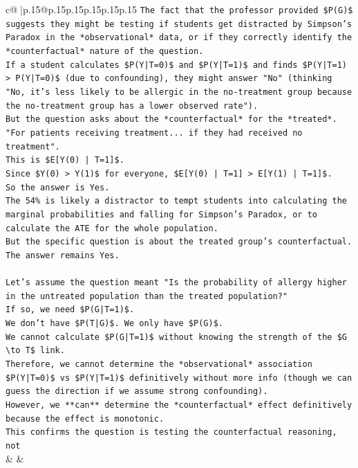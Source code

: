 \documentclass{article}
\begin{document}
{\begin{supertabular}{c@{$\;$}|p{.15\linewidth}@{}p{.15\linewidth}p{.15\linewidth}p{.15\linewidth}p{.15\linewidth}p{.15\linewidth}}
{{{\texttt{The fact that the professor provided \$P(G)\$ suggests they might be testing if students get distracted by Simpson's Paradox in the *observational* data, or if they correctly identify the *counterfactual* nature of the question.} \\
\texttt{If a student calculates \$P(Y|T=0)\$ and \$P(Y|T=1)\$ and finds \$P(Y|T=1) > P(Y|T=0)\$ (due to confounding), they might answer "No" (thinking "No, it's less likely to be allergic in the no{-}treatment group because the no{-}treatment group has a lower observed rate").} \\
\texttt{But the question asks about the *counterfactual* for the *treated*.} \\
\texttt{"For patients receiving treatment... if they had received no treatment".} \\
\texttt{This is \$E{[}Y(0) | T=1{]}\$.} \\
\texttt{Since \$Y(0) > Y(1)\$ for everyone, \$E{[}Y(0) | T=1{]} > E{[}Y(1) | T=1{]}\$.} \\
\texttt{So the answer is Yes.} \\
\texttt{The 54\% is likely a distractor to tempt students into calculating the marginal probabilities and falling for Simpson's Paradox, or to calculate the ATE for the whole population.} \\
\texttt{But the specific question is about the treated group's counterfactual.} \\
\texttt{The answer remains Yes.} \\
\\ 
\texttt{Let's assume the question meant "Is the probability of allergy higher in the untreated population than the treated population?"} \\
\texttt{If so, we need \$P(G|T=1)\$.} \\
\texttt{We don't have \$P(T|G)\$. We only have \$P(G)\$.} \\
\texttt{We cannot calculate \$P(G|T=1)\$ without knowing the strength of the \$G \textbackslash{}to T\$ link.} \\
\texttt{Therefore, we cannot determine the *observational* association \$P(Y|T=0)\$ vs \$P(Y|T=1)\$ definitively without more info (though we can guess the direction if we assume strong confounding).} \\
\texttt{However, we **can** determine the *counterfactual* effect definitively because the effect is monotonic.} \\
\texttt{This confirms the question is testing the counterfactual reasoning, not} \\
            }
        }
    }
    & & \\ \\


\end{supertabular}}
\end{document}
